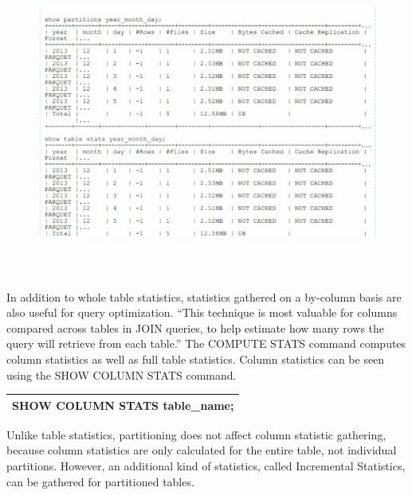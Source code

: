 \documentclass[onecolumn, draftclsnofoot,10pt, compsoc]{IEEEtran}
\begin{document}
\begin{figure}[ht]
    \centering
    \includegraphics[width=\linewidth, height=4in, keepaspectratio]{StatFig1.eps}
\end{figure}

In addition to whole table statistics, statistics gathered on a by-column basis are also useful for query optimization.
“This technique is most valuable for columns compared across tables in JOIN queries, to help estimate how many rows the query will retrieve from each table.”
The COMPUTE STATS command computes column statistics as well as full table statistics.
Column statistics can be seen using the SHOW COLUMN STATS command. 

\begin{center}
\begin{tabular}{ |c| }
    \hline
    SHOW COLUMN STATS table\_name; \\
    \hline
\end{tabular}
\end{center}

Unlike table statistics, partitioning does not affect column statistic gathering, because column statistics are only calculated for the entire table, not individual partitions.
However, an additional kind of statistics, called Incremental Statistics, can be gathered for partitioned tables. 
\end{document}
